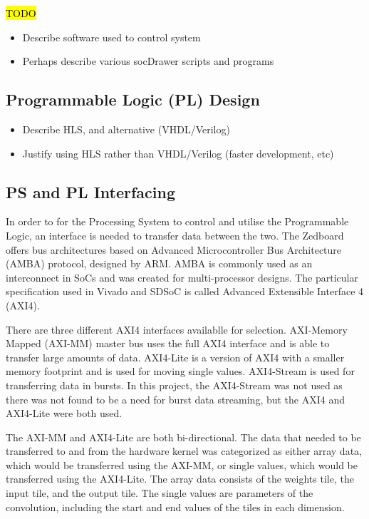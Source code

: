 \documentclass[12pt]{article}
\begin{document}
\hl{TODO}

\begin{itemize}
\item Describe software used to control system
\item Perhaps describe various socDrawer scripts and programs
\end{itemize}

\subsection{Programmable Logic (PL) Design}
\label{sec:Design-PL}


\begin{itemize}
\item Describe HLS, and alternative (VHDL/Verilog)
\item Justify using HLS rather than VHDL/Verilog (faster development, etc)
\end{itemize}

\subsection{PS and PL Interfacing}
\label{sec:Design-PSnPL}

In order to for the Processing System to control and utilise the Programmable Logic, an interface is needed to transfer data between the two. The Zedboard offers bus architectures based on Advanced Microcontroller Bus Architecture (AMBA) protocol, designed by ARM. AMBA is commonly used as an interconnect in SoCs and was created for multi-processor designs. The particular specification used in Vivado and SDSoC is called Advanced Extensible Interface 4 (AXI4). 

There are three different AXI4 interfaces availablle for selection. AXI-Memory Mapped (AXI-MM) master bus uses the full AXI4 interface and is able to transfer large amounts of data. AXI4-Lite is a version of AXI4 with a smaller memory footprint and is used for moving single values. AXI4-Stream is used for transferring data in bursts. In this project, the AXI4-Stream was not used as there was not found to be a need for burst data streaming, but the AXI4 and AXI4-Lite were both used. 

The AXI-MM and AXI4-Lite are both bi-directional. The data that needed to be transferred to and from the hardware kernel was categorized as either array data, which would be transferred using the AXI-MM, or single values, which would be transferred using the AXI4-Lite. The array data consists of the weights tile, the input tile, and the output tile. The single values are parameters of the convolution, including the start and end values of the tiles in each dimension.
\end{document}
